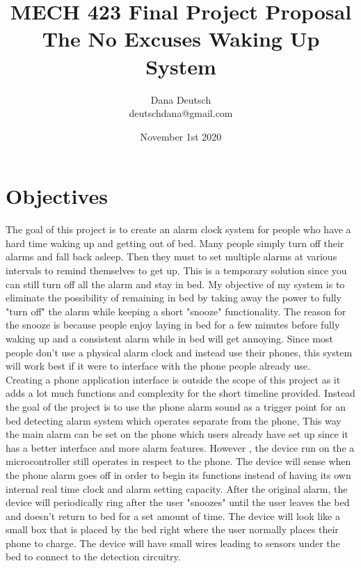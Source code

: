 \documentclass[11pt]{article}
\title{MECH 423 Final Project Proposal\\
		The No Excuses Waking Up System}
\author{Dana Deutsch\\
		deutschdana@gmail.com}
\date{November 1st 2020}
\begin{document}
\maketitle
\newpage
\tableofcontents
\newpage

\section{Objectives}
The goal of this project is to create an alarm clock system for people who have a hard time waking up and getting out of bed.
Many people simply turn off their alarms and fall back asleep.
Then they must to set multiple alarms at various intervals to remind themselves to get up.
This is a temporary solution since you can still turn off all the alarm and stay in bed.
My objective of my system is to eliminate the possibility of remaining in bed by taking away the power to fully "turn off" the alarm while keeping a short "snooze" functionality. 
The reason for the snooze is because people enjoy laying in bed for a few minutes before fully waking up and a consistent alarm while in bed will get annoying. 
Since most people don't use a physical alarm clock and instead use their phones, this system will work best if it were to interface with the phone people already use.\\

Creating a phone application interface is outside the scope of this project as it adds a lot much functions and complexity for the short timeline provided. 
Instead the goal of the project is to use the phone alarm sound as a trigger point for an bed detecting alarm system which operates separate from the phone,
This way the main alarm can be set on the phone which users already have set up since it has a better interface and more alarm features.
However , the device run on the a microcontroller still operates in respect to the phone. 
The device will sense when the phone alarm goes off in order to begin its functions instead of having its own internal real time clock and alarm setting capacity.  
After the original alarm, the device will periodically ring after the user "snoozes" until the user leaves the bed and doesn't return to bed for a set amount of time. 
The device will look like a small box that is placed by the bed right where the user normally places their phone to charge.
The device will have small wires leading to sensors under the bed to connect to the detection circuitry.
\end{document}
